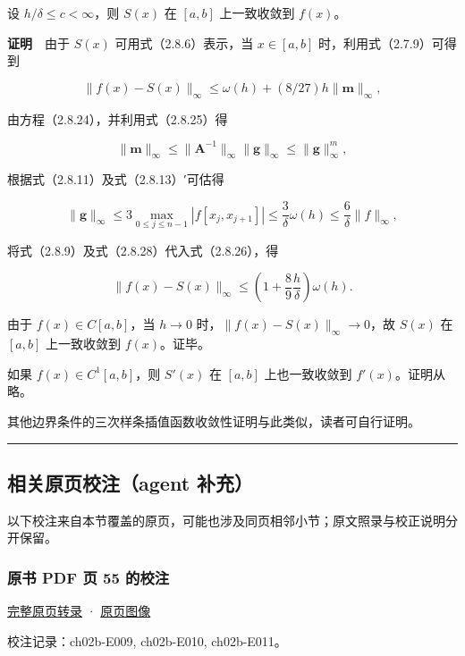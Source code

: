 \documentclass[
  10pt,
  fontset=fandol]{ctexart}
\begin{document}
设 \(h/\delta\leqslant c<\infty\)，则 \(S(x)\) 在 \([a,b]\) 上一致收敛到 \(f(x)\)。

\textbf{证明}　由于 \(S(x)\) 可用式（2.8.6）表示，当 \(x\in[a,b]\) 时，利用式（2.7.9）可得到

\[\|f(x)-S(x)\|_\infty\leqslant\omega(h)+(8/27)h\|\boldsymbol m\|_\infty,\tag{2.8.26}\]

由方程（2.8.24），并利用式（2.8.25）得

\[\|\boldsymbol m\|_\infty\leqslant\|\boldsymbol A^{-1}\|_\infty\|\boldsymbol g\|_\infty\leqslant\|\boldsymbol g\|_\infty^m,\tag{2.8.27}\]

根据式（2.8.11）及式（2.8.13）′可估得

\[\|\boldsymbol g\|_\infty\leqslant3\max_{0\leqslant j\leqslant n-1}|f[x_j,x_{j+1}]|\leqslant\frac3\delta\omega(h)\leqslant\frac6\delta\|f\|_\infty,\tag{2.8.28}\]

将式（2.8.9）及式（2.8.28）代入式（2.8.26），得

\[\|f(x)-S(x)\|_\infty\leqslant\left(1+\frac89\frac h\delta\right)\omega(h).\]

由于 \(f(x)\in C[a,b]\)，当 \(h\to0\) 时，\(\|f(x)-S(x)\|_\infty\to0\)，故 \(S(x)\) 在 \([a,b]\) 上一致收敛到 \(f(x)\)。证毕。

如果 \(f(x)\in C^1[a,b]\)，则 \(S'(x)\) 在 \([a,b]\) 上也一致收敛到 \(f'(x)\)。证明从略。

其他边界条件的三次样条插值函数收敛性证明与此类似，读者可自行证明。

\begin{center}\rule{0.5\linewidth}{0.5pt}\end{center}

\subsection{相关原页校注（agent 补充）}\label{ux76f8ux5173ux539fux9875ux6821ux6ce8agent-ux8865ux5145}

以下校注来自本节覆盖的原页，可能也涉及同页相邻小节；原文照录与校正说明分开保留。

\subsubsection{原书 PDF 页 55 的校注}\label{ux539fux4e66-pdf-ux9875-55-ux7684ux6821ux6ce8}

\href{../pages/pdf-055.md}{完整原页转录} · \href{../../source-images/pdf-055.jpeg}{原页图像}

校注记录：ch02b-E009, ch02b-E010, ch02b-E011。
\end{document}
